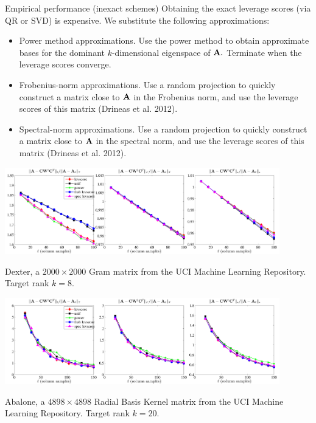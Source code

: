 \documentclass[xcolor=x11names,compress,ignorenonframetext,10pt]{beamer}
\renewcommand{\(}{\begin{columns}}
\renewcommand{\)}{\end{columns}}
\newcommand{\<}[1]{\begin{column}{#1}}
\renewcommand{\>}{\end{column}}
\def\refcolor{DodgerBlue4}
\newcommand{\refer}[1]{({\color{\refcolor}#1})}
\begin{document}
\begin{frame}{Empirical performance (inexact schemes)}
 Obtaining the exact leverage scores (via QR or SVD) is expensive. We substitute the
 following approximations:
 \begin{itemize}
  \item {\color{dgreen} Power method approximations}. Use the power method to obtain approximate bases for the 
  dominant $k$-dimensional eigenspace of $\mathbf{A}.$ Terminate when the leverage scores converge.
  \item {\color{dgreen} Frobenius-norm approximations}. Use a random projection to quickly construct 
  a matrix close to $\mathbf{A}$ in the Frobenius norm, and use the leverage scores of this matrix
  \refer{Drineas et al. 2012}.
  \item {\color{dgreen} Spectral-norm approximations}. Use a random projection to quickly
  construct a matrix close to $\mathbf{A}$ in the spectral norm, and use the leverage scores of this matrix
  \refer{Drineas et al. 2012}.
 \end{itemize}
 

\end{frame}

\begin{frame}

  \centerline{\includegraphics[width=4.7in, keepaspectratio=true]{figures/spsd/Dexterrank8inexact-methods-nonfixed-rank-errors}}

 Dexter, a $2000 \times 2000$ Gram matrix from the UCI Machine Learning Repository. 
 Target rank $k= 8.$
\end{frame}

\begin{frame}

  \centerline{\includegraphics[width=4.7in, keepaspectratio=true]{figures/spsd/Abalonesigma1inexact-methods-nonfixed-rank-errors}}

 Abalone, a $4898 \times 4898$ Radial Basis Kernel matrix from the UCI Machine Learning Repository. 
 Target rank $k= 20.$ 
\end{frame}
\end{document}
